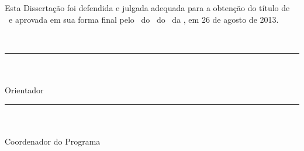 
\begin{center}

  \begin{singlespace}
  {
    \fontsize{14}{16}
    \selectfont
    
    {\bf \autorA}
    \\~\\
  }

  \vfill  

  {
    \fontsize{16}{18}
    \selectfont

    {\bf \tituloA}

  }

  \end{singlespace}

\end{center}

\vfill

{
  \fontsize{12}{14}
  \selectfont
  
  \noindent Esta Dissertação foi defendida e julgada adequada para a obtenção
  do título de \grau\ e aprovada em sua forma final pelo \programa\ do
  \departamento\ do \centro\ da \instituicaoA, em 26 de agosto de 2013.
  
}

\vfill

\begin{center}  
  
  {
    \fontsize{11}{13}
    \selectfont
    
    \begin{singlespace}

      ~\\
      \rule{100mm}{0.2mm}\\
      \orientadorA\\
      Orientador\\
      [1.0cm]

      \rule{100mm}{0.2mm}\\
      \coordenador\\
      Coordenador do Programa

    \end{singlespace}
    
  }
  
\end{center}

